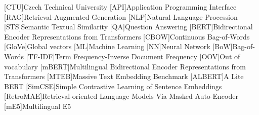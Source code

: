 
\begin{acronym}
  [CTU]{Czech Technical University}
  [API]{Application Programming Interface}
  [RAG]{Retrieval-Augmented Generation}
  [NLP]{Natural Language Procession}
  [STS]{Semantic Textual Similarity}
  [QA]{Question Answering}
  [BERT]{Bidirectional Encoder Representations from Transformers}
  [CBOW]{Continuous Bag-of-Words}
  [GloVe]{Global vectors}
  [ML]{Machine Learning}
  [NN]{Neural Network}
  [BoW]{Bag-of-Words}
  [TF-IDF]{Term Frequency-Inverse Document Frequency}
  [OOV]{Out of vocabulary}
  [mBERT]{Multilingual Bidirectional Encoder Representations from Transformers}
  [MTEB]{Massive Text Embedding Benchmark}
  [ALBERT]{A Lite BERT}
  [SimCSE]{Simple Contrastive Learning of Sentence Embeddings}
  [RetroMAE]{Retrieval-oriented Language Models Via Masked Auto-Encoder}
  [mE5]{Multilingual E5}
\end{acronym}

